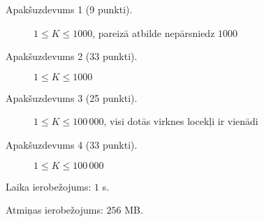 \documentclass{boi2014-lv}
\begin{document}
\Scoring

\begin{description}
    \item[Apakšuzdevums 1 (9 punkti).] $1 \le K \le 1000$, pareizā atbilde nepārsniedz $1000$ %
    \item[Apakšuzdevums 2 (33 punkti).] $1 \le K \le 1000$
    \item[Apakšuzdevums 3 (25 punkti).] $1 \le K \le 100\,000$, visi dotās virknes locekļi ir vienādi%
    \item[Apakšuzdevums 4 (33 punkti).] $1 \le K \le 100\,000$
\end{description}

\Constraints

Laika ierobežojums: $1$ s.

Atmiņas ierobežojums: $256$ MB.
\end{document}
